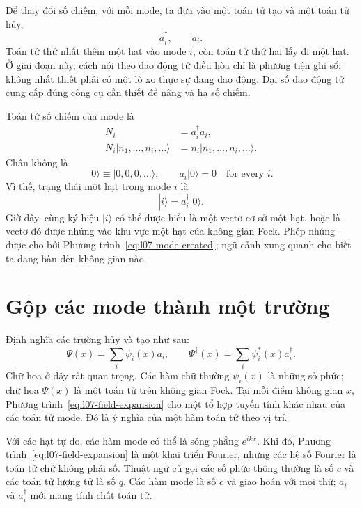 Để thay đổi số chiếm, với mỗi mode, ta đưa vào một toán tử tạo và một toán tử hủy,
\begin{equation}
a_i^\dagger,\qquad a_i.
\end{equation}
Toán tử thứ nhất thêm một hạt vào mode \(i\), còn toán tử thứ hai lấy đi một hạt. Ở giai đoạn này, cách nói theo dao động tử điều hòa chỉ là phương tiện ghi sổ: không nhất thiết phải có một lò xo thực sự đang dao động. Đại số dao động tử cung cấp đúng công cụ cần thiết để nâng và hạ số chiếm.

Toán tử số chiếm của mode là
\begin{equation}
\begin{aligned}
N_i&=a_i^\dagger a_i,\\
N_i|n_1,\ldots,n_i,\ldots\rangle
&=n_i|n_1,\ldots,n_i,\ldots\rangle.
\end{aligned}
\end{equation}
Chân không là
\begin{equation}
|0\rangle\equiv|0,0,0,\ldots\rangle,
\qquad
a_i|0\rangle=0
\quad\text{for every }i.
\label{eq:l07-vacuum}
\end{equation}
Vì thế, trạng thái một hạt trong mode \(i\) là
\begin{equation}
|i\rangle=a_i^\dagger|0\rangle.
\label{eq:l07-mode-created}
\end{equation}
Giờ đây, cùng ký hiệu \(|i\rangle\) có thể được hiểu là một vectơ cơ sở một hạt, hoặc là vectơ đó được nhúng vào khu vực một hạt của không gian Fock. Phép nhúng được cho bởi Phương trình~\eqref{eq:l07-mode-created}; ngữ cảnh xung quanh cho biết ta đang bàn đến không gian nào.

\section{Gộp các mode thành một trường}

Định nghĩa các trường hủy và tạo như sau:
\begin{equation}
\Psi(x)=\sum_i \psi_i(x)a_i,
\qquad
\Psi^\dagger(x)=\sum_i \psi_i^*(x)a_i^\dagger.
\label{eq:l07-field-expansion}
\end{equation}
Chữ hoa ở đây rất quan trọng. Các hàm chữ thường \(\psi_i(x)\) là những số phức; chữ hoa \(\Psi(x)\) là một toán tử trên không gian Fock. Tại mỗi điểm không gian \(x\), Phương trình~\eqref{eq:l07-field-expansion} cho một tổ hợp tuyến tính khác nhau của các toán tử mode. Đó là ý nghĩa của một hàm toán tử theo vị trí.

Với các hạt tự do, các hàm mode có thể là sóng phẳng \(e^{ikx}\). Khi đó, Phương trình~\eqref{eq:l07-field-expansion} là một khai triển Fourier, nhưng các hệ số Fourier là toán tử chứ không phải số. Thuật ngữ cũ gọi các số phức thông thường là số \(c\) và các toán tử lượng tử là số \(q\). Các hàm mode là số \(c\) và giao hoán với mọi thứ; \(a_i\) và \(a_i^\dagger\) mới mang tính chất toán tử.

